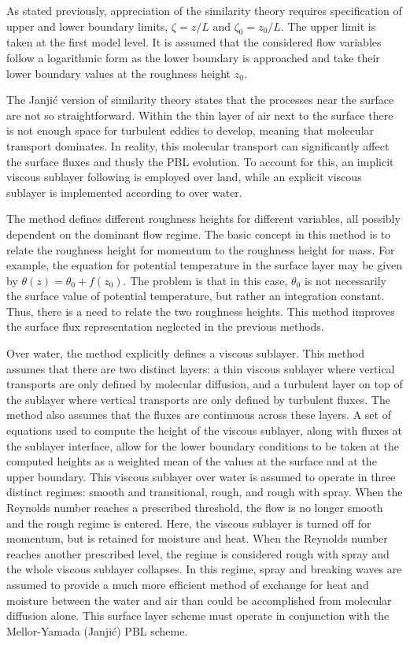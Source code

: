 As stated previously, appreciation of the similarity theory requires specification of upper and lower boundary limits, $\zeta = z/L$ and $\zeta_0 = z_0/L$. The upper limit is taken at the first model level. It is assumed that the considered flow variables follow a logarithmic form as the lower boundary is approached and take their lower boundary values at the roughness height $z_0$.

The Janji\'{c} version of similarity theory states that the processes near the surface are not so straightforward. Within the thin layer of air next to the surface there is not enough space for turbulent eddies to develop, meaning that molecular transport dominates. In reality, this molecular transport can significantly affect the surface fluxes and thusly the PBL evolution. To account for this, an implicit viscous sublayer following  \citet{Zilit} is employed over land, while an explicit viscous sublayer is implemented according to  \citet{Jan94} over water.

The  \citet{Zilit} method defines different roughness heights for different variables, all possibly dependent on the dominant flow regime. The basic concept in this method is to relate the roughness height for momentum to the roughness height for mass. For example, the equation for potential temperature in the surface layer may be given by $\theta(z) = \theta_0 + f(z_0)$. The problem is that in this case, $\theta_0$ is not necessarily the surface value of potential temperature, but rather an integration constant. Thus, there is a need to relate the two roughness heights. This method improves the surface flux representation neglected in the previous methods.

Over water, the  \citet{Jan94} method explicitly defines a viscous sublayer. This method assumes that there are two distinct layers: a thin viscous sublayer where vertical transports are only defined by molecular diffusion, and a turbulent layer on top of the sublayer where vertical transports are only defined by turbulent fluxes. The method also assumes that the fluxes are continuous across these layers. A set of equations used to compute the height of the viscous sublayer, along with fluxes at the sublayer interface, allow for the lower boundary conditions to be taken at the computed heights as a weighted mean of the values at the surface and at the upper boundary. This viscous sublayer over water is assumed to operate in three distinct regimes: smooth and transitional, rough, and rough with spray. When the Reynolds number reaches a prescribed threshold, the flow is no longer smooth and the rough regime is entered. Here, the viscous sublayer is turned off for momentum, but is retained for moisture and heat. When the Reynolds number reaches another prescribed level, the regime is considered rough with spray and the whole viscous sublayer collapses. In this regime, spray and breaking waves are assumed to provide a much more efficient method of exchange for heat and moisture between the water and air than could be accomplished from molecular diffusion alone. This surface layer scheme must operate in conjunction with the Mellor-Yamada (Janji\'{c}) PBL scheme.

